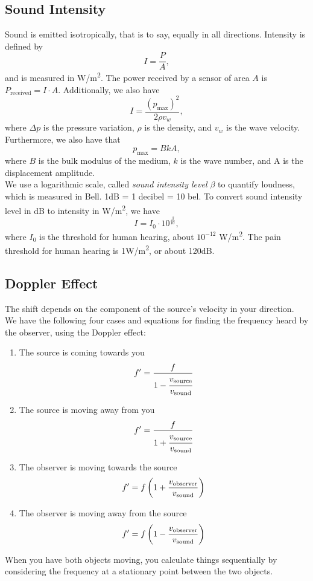 \documentclass[class=article, crop=false]{standalone}
\begin{document}
  \subsection{Sound Intensity}
  Sound is emitted isotropically, that is to say, equally in all directions. Intensity is defined by 
  \[
    I = \frac{P}{A},
  \]
  and is measured in W/m\textsuperscript{2}. The power received by a sensor of area $A$ is $P_{\text{received}} = I\cdot A$. Additionally, we also have
  \[
    I = \frac{(p_{\text{max}})^2}{2\rho v_w},
  \]
  where $\Delta p$ is the pressure variation, $\rho$ is the density, and $v_w$ is the wave velocity. \\[10pt]
  Furthermore, we also have that
  \[
    p_{\text{max}} = BkA,
  \]
  where $B$ is the bulk modulus of the medium, $k$ is the wave number, and A is the displacement amplitude.\\[10pt]
  We use a logarithmic scale, called \emph{sound intensity level $\beta$} to quantify loudness, which is measured in Bell. 1dB = 1 decibel = 10 bel. To convert sound intensity level in dB to intensity in W/m\textsuperscript{2}, we have
  \[
    I = I_0\cdot 10^{\frac{\beta}{10}},
  \]
  where $I_0$ is the threshold for human hearing, about $10^{-12}$ W/m\textsuperscript{2}. The pain threshold for human hearing is 1W/m\textsuperscript{2}, or about 120dB.
  \subsection{Doppler Effect}
  The shift depends on the component of the source's velocity in your direction. \\[10pt]
  We have the following four cases and equations for finding the frequency heard by the observer, using the Doppler effect:
  \begin{enumerate}[label=(\alph*)]
    \item The source is coming towards you
    \[
      f'=\frac{f}{1-\cfrac{v_{\text{source}}}{v_{\text{sound}}}}
    \]
    \item The source is moving away from you
    \[
      f' = \frac{f}{1+\cfrac{v_{\text{source}}}{v_{\text{sound}}}}
    \]
    \item The observer is moving towards the source
    \[
      f' = f \left( 1+\frac{v_{\text{observer}}}{v_{\text{sound}}} \right)
    \]
    \item The observer is moving away from the source
    \[
      f' = f \left( 1 - \frac{v_{\text{observer}}}{v_{\text{sound}}} \right)
    \]
  \end{enumerate}
  When you have both objects moving, you calculate things sequentially by considering the frequency at a stationary point between the two objects.
\end{document}
